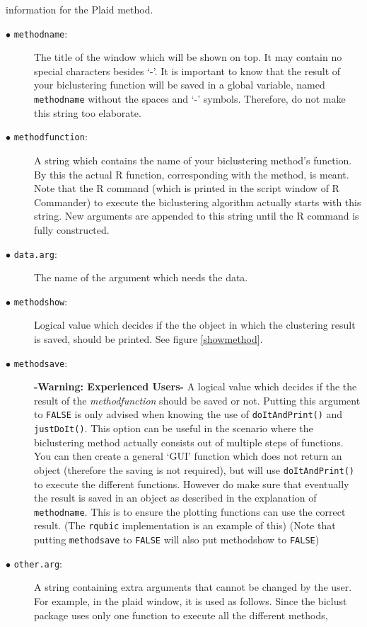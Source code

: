 \documentclass[a4paper]{article}\usepackage[]{graphicx}\usepackage[]{color}
\begin{document}
information for the Plaid method.
\begin{description}
  \item[$\bullet$ \texttt{methodname}:] The title of the window which will be
  shown on top. It may contain no special characters besides `-'. It is
  important to know that the result of your biclustering function will be saved in
  a global variable, named \verb|methodname| without the spaces and `-' symbols.
  Therefore, do not make this string too elaborate.
  \item[$\bullet$ \texttt{methodfunction}:] A string which contains the name of
  your biclustering method's function. By this the actual R function,
  corresponding with the method, is meant. Note that the R command (which is printed in the script
window of R Commander) to execute the biclustering algorithm actually
starts with this string. New arguments are appended to this string until the
R command is fully constructed.
  \item[$\bullet$ \texttt{data.arg}:] The name of the argument which needs the
  data.
  \item[$\bullet$ \texttt{methodshow}:] Logical value which decides if the the
  object in which the clustering result is saved, should be printed. See figure
  \ref{showmethod}.
  \item[$\bullet$ \texttt{methodsave}:] {\bf -Warning: Experienced Users-} A logical value which decides if the
  the result of the {\it methodfunction} should be saved or not. Putting this
  argument to \verb|FALSE| is only advised when knowing the use of
  \verb|doItAndPrint()| and \verb|justDoIt()|. This option can be useful in the
  scenario where the biclustering method actually consists out of multiple steps
  of functions. You can then create a general `GUI' function which does not
  return an object (therefore the saving is not required), but will use
  \verb|doItAndPrint()| to execute the different functions. However do make sure
  that eventually the result is saved in an object as described in the
  explanation of \verb|methodname|. This is to ensure the plotting functions can
  use the correct result. (The \verb|rqubic| implementation is an example of this) 
  (Note that putting \verb|methodsave| to \verb|FALSE| will also put methodshow
  to \verb|FALSE|)
  \item[$\bullet$ \texttt{other.arg}:] A string containing extra arguments that cannot be changed
by the user. For example, in the plaid window, it is used as follows. Since the
biclust package uses only one function to execute all the different methods,

\end{description}
\end{document}
